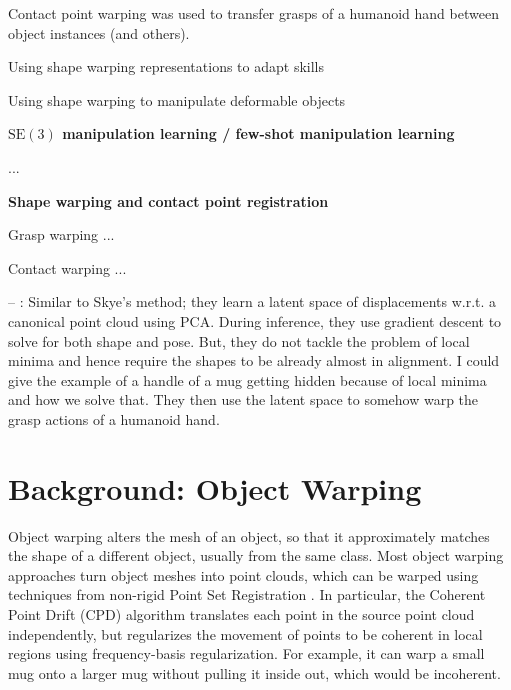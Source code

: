 \documentclass{article}
\begin{document}
Contact point warping was used to transfer grasps of a humanoid hand between object instances \cite{li07DataDriven,benamor12Generalization,hillenbrand12Transferring,jakel12Learning,stouraitis15Functional,rodriguez18Learning,pavlichenko19Autonomous,tian19Transferring} (and others).

Using shape warping representations to adapt skills \cite{brandi14Generalizing}

Using shape warping to manipulate deformable objects \cite{lee15Learning,schulman16Learning}

\textbf{$\mathrm{SE(3)}$ manipulation learning / few-shot manipulation learning}

\cite{wen22You} ...

\textbf{Shape warping and contact point registration}

Grasp warping \citep{li07DataDriven} ...

Contact warping \citep{brandi14Generalizing,hillenbrand12Transferring,jakel12Learning} ...

-- \cite{rodriguez18Transferringa,rodriguez18Transferringb}: Similar to Skye's method; they learn a latent space of displacements w.r.t. a canonical point cloud using PCA. During inference, they use gradient descent to solve for both shape and pose. But, they do not tackle the problem of local minima and hence require the shapes to be already almost in alignment. I could give the example of a handle of a mug getting hidden because of local minima and how we solve that. They then use the latent space to somehow warp the grasp actions of a humanoid hand.

\section{Background: Object Warping}
\label{sec:background}

Object warping alters the mesh of an object, so that it approximately matches the shape of a different object, usually from the same class. Most object warping approaches turn object meshes into point clouds, which can be warped using techniques from non-rigid Point Set Registration \cite{zhu19Review}. In particular, the Coherent Point Drift (CPD) algorithm \cite{myronenko10point} translates each point in the source point cloud independently, but regularizes the movement of points to be coherent in local regions using frequency-basis regularization. For example, it can warp a small mug onto a larger mug without pulling it inside out, which would be incoherent.
\end{document}
